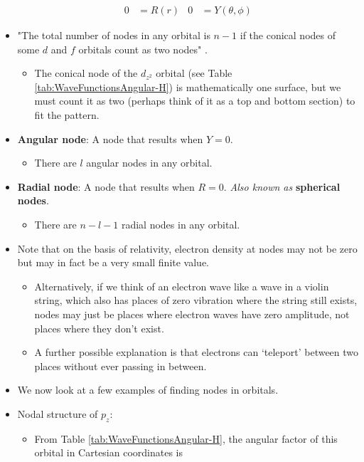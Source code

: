 \documentclass[../notes.tex]{subfiles}
\begin{document}
\begin{itemize}
\begin{align*}
        0 &= R(r)&
            0 &= Y(\theta,\phi)
    \end{align*}
    \item "The total number of nodes in any orbital is $n-1$ if the conical nodes of some $d$ and $f$ orbitals count as two nodes" \parencite[23]{bib:MiesslerFischerTarr}.
    \begin{itemize}
        \item The conical node of the $d_{z^2}$ orbital (see Table \ref{tab:WaveFunctionsAngular-H}) is mathematically one surface, but we must count it as two (perhaps think of it as a top and bottom section) to fit the pattern.
    \end{itemize}
    \item \textbf{Angular node}: A node that results when $Y=0$.
    \begin{itemize}
        \item There are $l$ angular nodes in any orbital.
    \end{itemize}
    \item \textbf{Radial node}: A node that results when $R=0$. \emph{Also known as} \textbf{spherical nodes}.
    \begin{itemize}
        \item There are $n-l-1$ radial nodes in any orbital.
    \end{itemize}
    \item Note that on the basis of relativity, electron density at nodes may not be zero but may in fact be a very small finite value.
    \begin{itemize}
        \item Alternatively, if we think of an electron wave like a wave in a violin string, which also has places of zero vibration where the string still exists, nodes may just be places where electron waves have zero amplitude, not places where they don't exist.
        \item A further possible explanation is that electrons can `teleport' between two places without ever passing in between.
    \end{itemize}
    \item We now look at a few examples of finding nodes in orbitals.
    \item Nodal structure of $p_z$:
    \begin{itemize}
        \item From Table \ref{tab:WaveFunctionsAngular-H}, the angular factor of this orbital in Cartesian coordinates is
        \begin{equation*}

\end{equation*}
\end{itemize}
\end{itemize}
\end{document}
